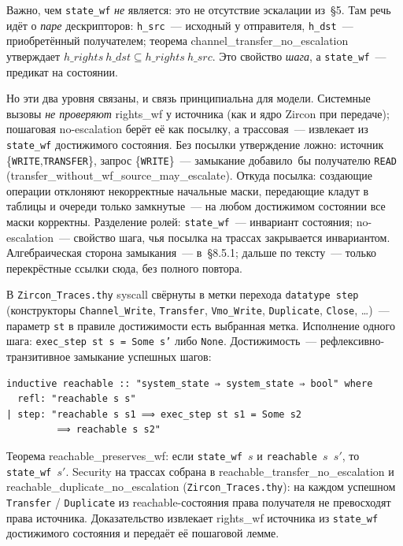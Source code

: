 \documentclass[11pt,a4paper]{article}
\newcommand{\isabel}[1]{{\isabelleit #1}}
\newcommand{\lemmaname}[1]{\isabel{#1}}
\begin{document}
Важно, чем \texttt{state\_wf} \emph{не} является: это не отсутствие
эскалации из~§5. Там речь идёт о \emph{паре} дескрипторов:
\texttt{h\_src}~--- исходный у отправителя, \texttt{h\_dst}~---
приобретённый получателем; теорема
\lemmaname{channel\_transfer\_no\_escalation} утверждает
$h\_rights\ h\_\textit{dst} \subseteq h\_rights\ h\_\textit{src}$. Это
свойство \emph{шага}, а \texttt{state\_wf}~--- предикат на состоянии.

Но эти два уровня связаны, и связь принципиальна для модели.
Системные вызовы \emph{не проверяют} \lemmaname{rights\_wf} у
источника (как и ядро Zircon при передаче); пошаговая no-escalation
берёт её как посылку, а трассовая~--- извлекает из \texttt{state\_wf}
достижимого состояния. Без посылки утверждение ложно: источник
\{\texttt{WRITE},\texttt{TRANSFER}\}, запрос \{\texttt{WRITE}\}~---
замыкание добавило~бы получателю \texttt{READ}
(\lemmaname{transfer\_without\_wf\_source\_may\_escalate}). Откуда
посылка: создающие операции отклоняют некорректные начальные маски,
передающие кладут в таблицы и очереди только замкнутые~--- на любом
достижимом состоянии все маски корректны. Разделение ролей:
\texttt{state\_wf}~--- инвариант состояния; no-escalation~--- свойство
шага, чья посылка на трассах закрывается инвариантом. Алгебраическая
сторона замыкания~--- в~§8.5.1; дальше по тексту~--- только
перекрёстные ссылки сюда, без полного повтора.

В \texttt{Zircon\_Traces.thy} syscall свёрнуты в метки перехода
\texttt{datatype~step} (конструкторы \texttt{Channel\_Write},
\texttt{Transfer}, \texttt{Vmo\_Write}, \texttt{Duplicate},
\texttt{Close}, \ldots)~--- параметр \texttt{st} в правиле достижимости
есть выбранная метка. Исполнение одного шага:
\texttt{exec\_step~st~s = Some~s'} либо \texttt{None}. Достижимость~---
рефлексивно-транзитивное замыкание успешных шагов:
\begin{lstlisting}
inductive reachable :: "system_state ⇒ system_state ⇒ bool" where
  refl: "reachable s s"
| step: "reachable s s1 ⟹ exec_step st s1 = Some s2
         ⟹ reachable s s2"
\end{lstlisting}
Теорема \lemmaname{reachable\_preserves\_wf}: если \texttt{state\_wf~$s$}
и \texttt{reachable~$s$~$s'$}, то \texttt{state\_wf~$s'$}. Security на
трассах собрана в
\lemmaname{reachable\_transfer\_no\_escalation} и
\lemmaname{reachable\_duplicate\_no\_escalation}
(\texttt{Zircon\_Traces.thy}): на каждом успешном \texttt{Transfer} /
\texttt{Duplicate} из reachable-состояния права получателя не
превосходят права источника. Доказательство извлекает
\lemmaname{rights\_wf} источника из \texttt{state\_wf} достижимого
состояния и передаёт её пошаговой лемме.
\end{document}
